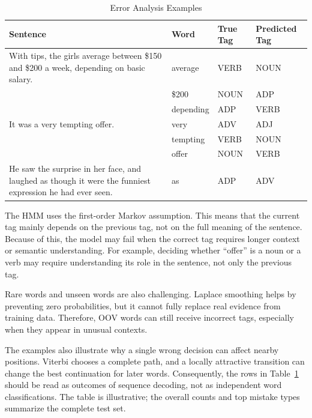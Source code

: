 \documentclass[12pt,a4paper]{article}
\begin{document}
\begin{table}[t]
    \centering
    \caption{Error Analysis Examples}
    \label{tab:error-examples}
    \footnotesize
    \begin{tabular}{p{}p{}p{}p{}}
        \toprule
        \textbf{Sentence} & \textbf{Word} & \textbf{True Tag} & \textbf{Predicted Tag} \\
        \midrule
        With tips, the girls average between \$150 and \$200 a week, depending on basic salary.
        & average & VERB & NOUN \\
        & \$200 & NOUN & ADP \\
        & depending & ADP & VERB \\
        \midrule
        It was a very tempting offer.
        & very & ADV & ADJ \\
        & tempting & VERB & NOUN \\
        & offer & NOUN & VERB \\
        \midrule
        He saw the surprise in her face, and laughed as though it were the funniest expression he had ever seen.
        & as & ADP & ADV \\
        \bottomrule
    \end{tabular}
\end{table}

The HMM uses the first-order Markov assumption. This means that the current tag
mainly depends on the previous tag, not on the full meaning of the sentence.
Because of this, the model may fail when the correct tag requires longer context
or semantic understanding. For example, deciding whether ``offer'' is a noun or a
verb may require understanding its role in the sentence, not only the previous
tag.

Rare words and unseen words are also challenging. Laplace smoothing helps by
preventing zero probabilities, but it cannot fully replace real evidence from
training data. Therefore, OOV words can still receive incorrect tags, especially
when they appear in unusual contexts.

The examples also illustrate why a single wrong decision can affect nearby
positions. Viterbi chooses a complete path, and a locally attractive transition
can change the best continuation for later words. Consequently, the rows in
Table~\ref{tab:error-examples} should be read as outcomes of sequence decoding,
not as independent word classifications. The table is illustrative; the overall
counts and top mistake types summarize the complete test set.
\end{document}
